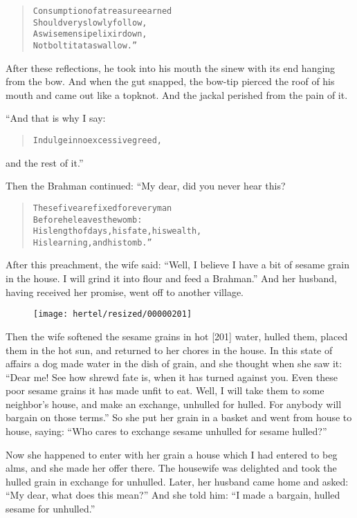 \documentclass[article, twoside, 10pt]{memoir}
\renewenvironment{verbatim}{%
\begin{quote}%
\vskip -10pt%
\begin{alltt}\normalfont\small}{\end{alltt}%
\end{quote}%
\vskip -10pt
} %
\begin{document}
\begin{verbatim}
Consumption of a treasure earned
    Should very slowly follow,
As wise men sip elixir down,
    Not bolt it at a swallow.”
\end{verbatim}
After these reflections, he took into his mouth the sinew with its
end hanging from the bow. And when the gut snapped, the bow-tip
pierced the roof of his mouth and came out like a topknot. And the
jackal perished from the pain of it.

“And that is why I say:

\begin{verbatim}
Indulge in no excessive greed,
\end{verbatim}
and the rest of it.”

Then the Brahman continued: “My dear, did you never hear this?

\begin{verbatim}
These five are fixed for every man
    Before he leaves the womb:
His length of days, his fate, his wealth,
    His learning, and his tomb.”
\end{verbatim}
After this preachment, the wife said:
``Well, I believe I have a bit of sesame grain in the house. I will grind it into flour and feed a Brahman.''
And her husband, having received her promise, went off to another
village.

\begin{figure}[p]\texttt{[image: hertel/resized/00000201]}\end{figure}Then the wife softened the sesame grains in hot [201] water, hulled
them, placed them in the hot sun, and returned to her chores in the
house. In this state of affairs a dog made water in the dish of
grain, and she thought when she saw it:
``Dear me! See how shrewd fate is, when it has turned against you. Even these poor sesame grains it has made unfit to eat. Well, I will take them to some neighbor's house, and make an exchange, unhulled for hulled. For anybody will bargain on those terms.''
So she put her grain in a basket and went from house to house,
saying:
``Who cares to exchange sesame unhulled for sesame hulled?''

Now she happened to enter with her grain a house which I had
entered to beg alms, and she made her offer there. The housewife
was delighted and took the hulled grain in exchange for unhulled.
Later, her husband came home and asked:
``My dear, what does this mean?'' And she told him:
``I made a bargain, hulled sesame for unhulled.''
\end{document}
